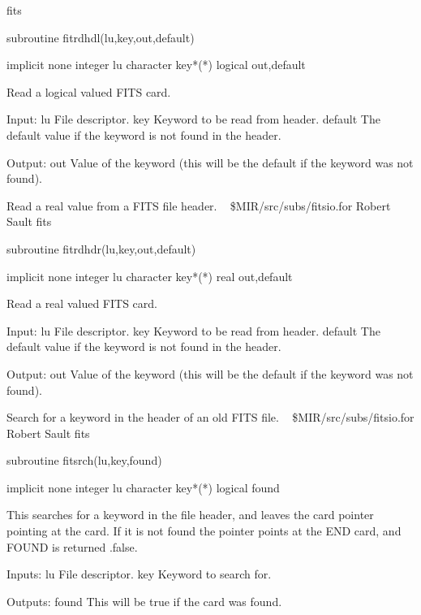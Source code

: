 \newline {} fits
\par{\tenpoint
{\eightpoint\begintt
        subroutine fitrdhdl(lu,key,out,default)

        implicit none
        integer lu
        character key*(*)
        logical out,default

  Read a logical valued FITS card.

  Input:
    lu         File descriptor.
    key        Keyword to be read from header.
    default    The default value if the keyword is not found in the header.

  Output:
    out        Value of the keyword (this will be the default if the
               keyword was not found).
\endtt}
\par}
%
\noindent Read a real value from a FITS file header.
\newline \ 
\newline {} \$MIR/src/subs/fitsio.for
\newline {} Robert Sault
\newline {} fits
\par{\tenpoint
{\eightpoint\begintt
        subroutine fitrdhdr(lu,key,out,default)

        implicit none
        integer lu
        character key*(*)
        real out,default

  Read a real valued FITS card.

  Input:
    lu         File descriptor.
    key        Keyword to be read from header.
    default    The default value if the keyword is not found in the header.

  Output:
    out        Value of the keyword (this will be the default if the
               keyword was not found).
\endtt}
\par}
%
\noindent Search for a keyword in the header of an old FITS file.
\newline \ 
\newline \abox{File:} \$MIR/src/subs/fitsio.for
\newline {} Robert Sault
\newline \abox{Keywords:} fits
\par{\tenpoint
{\eightpoint\begintt
        subroutine fitsrch(lu,key,found)

        implicit none
        integer lu
        character key*(*)
        logical found

  This searches for a keyword in the file header, and leaves the
  card pointer pointing at the card. If it is not found
  the pointer points at the END card, and FOUND is returned .false.

  Inputs:
    lu         File descriptor.
    key        Keyword to search for.

  Outputs:
    found      This will be true if the card was found.
\endtt}
\par}
